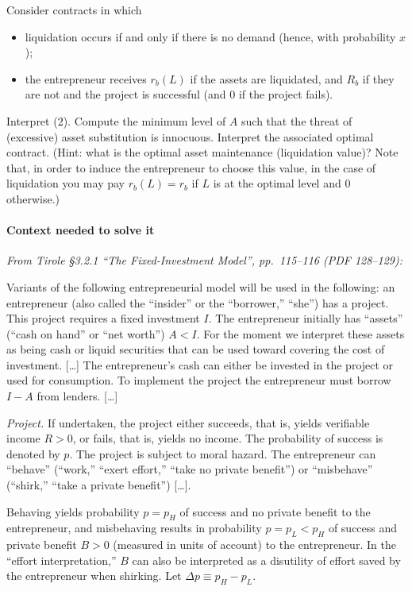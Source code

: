 \documentclass[11pt,a4paper]{article}
\providecommand{\tightlist}{\setlength{\itemsep}{0pt}\setlength{\parskip}{0pt}}
\begin{document}
Consider contracts in which

\begin{itemize}
\tightlist
\item
  liquidation occurs if and only if there is no demand (hence, with probability \(x\));
\item
  the entrepreneur receives \(r_b(L)\) if the assets are liquidated, and \(R_b\) if they are not and
  the project is successful (and 0 if the project fails).
\end{itemize}

Interpret (2). Compute the minimum level of \(A\) such that the threat of (excessive) asset
substitution is innocuous. Interpret the associated optimal contract. (Hint: what is the optimal
asset maintenance (liquidation value)? Note that, in order to induce the entrepreneur to choose this
value, in the case of liquidation you may pay \(r_b(L) = r_b\) if \(L\) is at the optimal level and
0 otherwise.)

\paragraph{Context needed to solve it}

\emph{From Tirole §3.2.1 ``The Fixed-Investment Model'', pp.~115--116 (PDF 128--129):}

Variants of the following entrepreneurial model will be used in the following: an entrepreneur (also
called the ``insider'' or the ``borrower,'' ``she'') has a project. This project requires a fixed
investment \(I\). The entrepreneur initially has ``assets'' (``cash on hand'' or ``net worth'')
\(A < I\). For the moment we interpret these assets as being cash or liquid securities that can be
used toward covering the cost of investment. {[}\ldots{]} The entrepreneur's cash can either be
invested in the project or used for consumption. To implement the project the entrepreneur must
borrow \(I - A\) from lenders. {[}\ldots{]}

\emph{Project.} If undertaken, the project either succeeds, that is, yields verifiable income
\(R > 0\), or fails, that is, yields no income. The probability of success is denoted by \(p\). The
project is subject to moral hazard. The entrepreneur can ``behave'' (``work,'' ``exert effort,''
``take no private benefit'') or ``misbehave'' (``shirk,'' ``take a private benefit'') {[}\ldots{]}.

Behaving yields probability \(p = p_H\) of success and no private benefit to the entrepreneur, and
misbehaving results in probability \(p = p_L < p_H\) of success and private benefit \(B > 0\)
(measured in units of account) to the entrepreneur. In the ``effort interpretation,'' \(B\) can also
be interpreted as a disutility of effort saved by the entrepreneur when shirking. Let
\(\Delta p \equiv p_H - p_L\).
\end{document}
